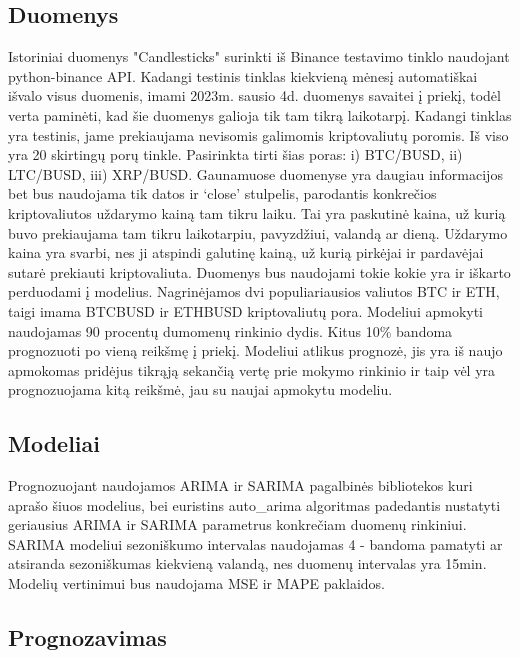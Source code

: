 \documentclass{VUMIFInfKursinis}
\begin{document}
\subsection{Duomenys}
Istoriniai duomenys "Candlesticks" surinkti iš Binance testavimo tinklo naudojant python-binance API. Kadangi testinis tinklas kiekvieną mėnesį automatiškai 
išvalo visus duomenis, imami 2023m. sausio 4d. duomenys savaitei į priekį, todėl verta paminėti, kad šie duomenys galioja tik tam tikrą laikotarpį. 
Kadangi tinklas yra testinis, jame prekiaujama nevisomis galimomis kriptovaliutų poromis. Iš viso yra 20 skirtingų porų tinkle. Pasirinkta tirti šias poras: 
i) BTC/BUSD, ii) LTC/BUSD, iii) XRP/BUSD.
Gaunamuose duomenyse yra daugiau informacijos bet bus naudojama tik datos ir `close' stulpelis, parodantis konkrečios kriptovaliutos uždarymo kainą tam tikru laiku. Tai yra paskutinė 
kaina, už kurią buvo prekiaujama tam tikru laikotarpiu, pavyzdžiui, valandą ar dieną. Uždarymo kaina yra svarbi, nes ji atspindi galutinę kainą, už kurią pirkėjai ir pardavėjai
sutarė prekiauti kriptovaliuta. Duomenys bus naudojami tokie kokie yra ir iškarto perduodami į modelius. Nagrinėjamos dvi populiariausios valiutos BTC ir ETH, taigi imama
BTCBUSD ir ETHBUSD kriptovaliutų pora. Modeliui apmokyti naudojamas 90 procentų dumomenų rinkinio dydis. Kitus 10\% bandoma prognozuoti po vieną reikšmę į priekį. Modeliui atlikus prognozė, 
jis yra iš naujo apmokomas pridėjus tikrąją sekančią vertę prie mokymo rinkinio ir taip vėl yra prognozuojama kitą reikšmė, jau su naujai apmokytu modeliu.

\subsection{Modeliai}
Prognozuojant naudojamos ARIMA ir SARIMA pagalbinės bibliotekos\cite{seabold2010statsmodels} kuri aprašo šiuos modelius, 
bei euristins auto\_arima algoritmas\cite{pmdarima} padedantis nustatyti geriausius ARIMA ir SARIMA parametrus konkrečiam duomenų rinkiniui.
SARIMA modeliui sezoniškumo intervalas naudojamas 4 - bandoma pamatyti ar atsiranda sezoniškumas kiekvieną valandą, nes duomenų intervalas yra 15min.
Modelių vertinimui bus naudojama MSE ir MAPE paklaidos.

\subsection{Prognozavimas}
\end{document}
